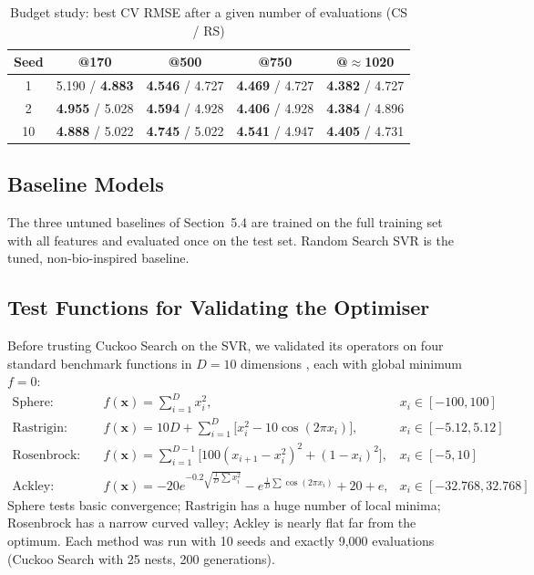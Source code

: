 \documentclass[12pt,a4paper]{article}
\numberwithin{equation}{section}
\numberwithin{table}{section}
\numberwithin{figure}{section}
\begin{document}
\begin{table}[H]
\centering
\caption{Budget study: best CV RMSE after a given number of evaluations (CS / RS)}
\label{tab:budget}
\small
\begin{tabular}{@{}ccccc@{}}
\toprule
\textbf{Seed} & \textbf{@170} & \textbf{@500} & \textbf{@750} & \textbf{@$\approx$1020} \\ \midrule
1  & 5.190 / \textbf{4.883} & \textbf{4.546} / 4.727 & \textbf{4.469} / 4.727 & \textbf{4.382} / 4.727 \\
2  & \textbf{4.955} / 5.028 & \textbf{4.594} / 4.928 & \textbf{4.406} / 4.928 & \textbf{4.384} / 4.896 \\
10 & \textbf{4.888} / 5.022 & \textbf{4.745} / 5.022 & \textbf{4.541} / 4.947 & \textbf{4.405} / 4.731 \\ \bottomrule
\end{tabular}
\end{table}

\subsection{Baseline Models}
The three untuned baselines of Section~5.4 are trained on the full training set with all features and evaluated once on the test set. Random Search SVR is the tuned, non-bio-inspired baseline.

\subsection{Test Functions for Validating the Optimiser}\label{sec:testfun}
Before trusting Cuckoo Search on the SVR, we validated its operators on four standard benchmark functions in $D = 10$ dimensions \cite{jamil2013}, each with global minimum $f = 0$:
\begin{align}
  \text{Sphere:} \quad & f(\mathbf{x}) = \textstyle\sum_{i=1}^{D} x_i^2, & x_i \in [-100, 100] \\
  \text{Rastrigin:} \quad & f(\mathbf{x}) = 10D + \textstyle\sum_{i=1}^{D} \big[x_i^2 - 10\cos(2\pi x_i)\big], & x_i \in [-5.12, 5.12] \\
  \text{Rosenbrock:} \quad & f(\mathbf{x}) = \textstyle\sum_{i=1}^{D-1} \big[100(x_{i+1} - x_i^2)^2 + (1 - x_i)^2\big], & x_i \in [-5, 10] \\
  \text{Ackley:} \quad & f(\mathbf{x}) = -20 e^{-0.2\sqrt{\frac{1}{D}\sum x_i^2}} - e^{\frac{1}{D}\sum \cos(2\pi x_i)} + 20 + e, & x_i \in [-32.768, 32.768]
\end{align}
Sphere tests basic convergence; Rastrigin has a huge number of local minima; Rosenbrock has a narrow curved valley; Ackley is nearly flat far from the optimum. Each method was run with 10 seeds and exactly 9,000 evaluations (Cuckoo Search with 25 nests, 200 generations).
\end{document}
